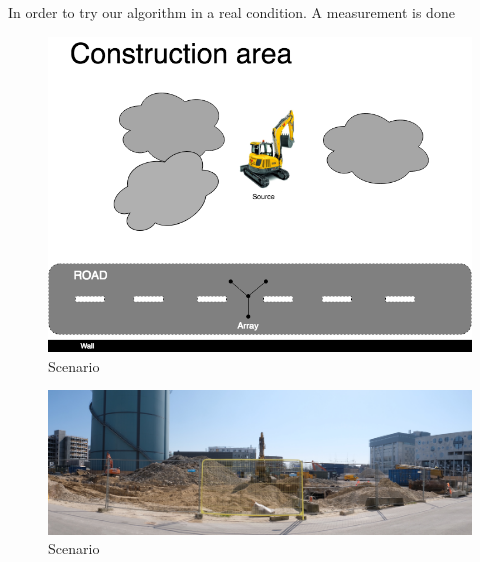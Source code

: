 In order to try our algorithm in a real condition. A measurement is done 

\begin{figure}[H]
    \centering
    \includegraphics[width=1\textwidth]{Figures/scenario1.png}
    \caption{Scenario}
    \label{fig:Scenario1}
\end{figure}
 
\begin{figure}[H]
    \centering
    \includegraphics[width=1\textwidth]{Figures/Scenario1pic.jpg}
    \caption{Scenario}
    \label{fig:Scenario1pic}
\end{figure}

 